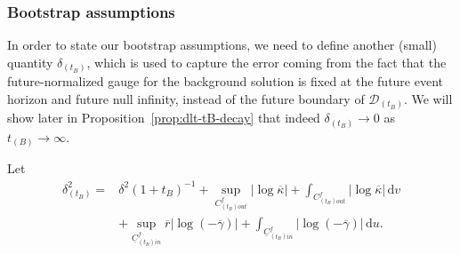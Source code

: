 \documentclass[10pt, reqno]{amsart}
\theoremstyle{definition}
\theoremstyle{remark}
\theoremstyle{conjecture}
\numberwithin{equation}{section}
\newcommand{\abs}[1]{\vert#1\vert}
\newcommand{\ud}{\mathrm{d}}
\newcommand{\0}{\emptyset}
\newcommand{\gmm}{\gamma}
\newcommand{\dlt}{\delta}
\newcommand{\kpp}{\kappa}
\newcommand{\lmb}{\lambda}
\newcommand{\calD}{\mathcal D}
\newcommand{\uC}{\underline{C}}
\newcommand{\dur}{\nu}
\newcommand{\dvr}{\lmb}
\newcommand{\rbg}{\overline{r}}					%
\newcommand{\kppbg}{\overline{\kpp}}					%
\newcommand{\gmmbg}{\overline{\gmm}}					%
\begin{document}
\subsubsection*{Bootstrap assumptions}
In order to state our bootstrap assumptions, we need to define another (small) quantity $\dlt_{(t_B)}$, which is used to capture the error coming from the fact that the future-normalized gauge for the background solution is fixed at the future event horizon and future null infinity, instead of the future boundary of $\calD_{(t_B)}$. We will show later in Proposition~\ref{prop:dlt-tB-decay} that indeed $\dlt_{(t_{B})} \to 0$ as $t_{(B)}\to \infty$. 

Let
\begin{equation} \label{eq:dlt-tB}
\begin{aligned}
\dlt_{(t_{B})}^{2}
= & \dlt^{2} (1 + t_{B})^{-1} + \sup_{C_{(t_{B}) out}^{f}} \abs{\log \kppbg}
 + \int_{C_{(t_{B}) out}^{f}} \abs{\log \kppbg} \, \ud v \\
& + \sup_{\uC_{(t_{B}) in}^{f}} \rbg \abs{\log (-\gmmbg)} 
+ \int_{\uC_{(t_{B}) in}^{f}} \abs{\log (-\gmmbg)} \, \ud u.
\end{aligned}
\end{equation}
\end{document}
